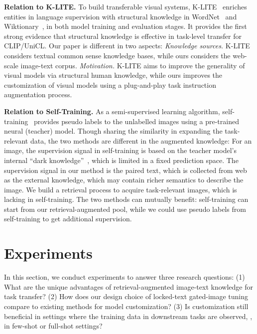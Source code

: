 \documentclass[10pt,twocolumn,letterpaper]{article}
\renewcommand{\paragraph}[1]{\vspace{1.25mm}\noindent\textbf{#1}}
\begin{document}
\paragraph{Relation to K-LITE.} To build transferable visual systems, K-LITE~\cite{shen2022klite} enriches entities in language supervision with structural knowledge in  WordNet~\cite{miller1998wordnet} and Wiktionary~\cite{meyer2012wiktionary}, in both model training and evaluation stages. It provides the first strong evidence that structural knowledge is effective in task-level transfer for CLIP/UniCL. Our paper is different in two aspects: 
 {\it Knowledge sources.} K-LITE considers textual common sense knowledge bases, while ours considers the web-scale image-text corpus.
 {\it Motivation.} K-LITE aims to improve the generality of visual models via structural human knowledge, while ours improves the customization of visual models using a plug-and-play task instruction augmentation process.

\paragraph{Relation to Self-Training.} As a semi-supervised learning algorithm, self-training~\cite{scudder1965probability,xie2020self} provides pseudo labels to the unlabelled images using a pre-trained neural (teacher) model.
Though sharing the similarity in expanding the task-relevant data, the two methods are different in the augmented knowledge: 
 For an image, the supervision signal in self-training is based on the teacher model's internal ``dark knowledge''~\cite{hinton2014dark}, which is limited in a fixed prediction space. The supervision signal in our method is the paired text, which is collected from web as the external knowledge, which may contain richer semantics to describe the image.
 We build a retrieval process to acquire task-relevant images, which is lacking in self-training. The two methods can mutually benefit: self-training can start from our retrieval-augmented pool, while we could use pseudo labels from self-training to get additional supervision. 
\vspace{-2mm}
\section{Experiments}
\label{sec:experiments}
\vspace{-2mm}
In this section, we conduct experiments to answer three research questions: (1) What are the unique advantages of retrieval-augmented image-text knowledge for task transfer? (2) How does our design choice of locked-text gated-image tuning compare to existing methods for model customization? (3) Is customization still beneficial in settings where the training data in downstream tasks are observed, \ie, in few-shot or full-shot settings?
\end{document}
